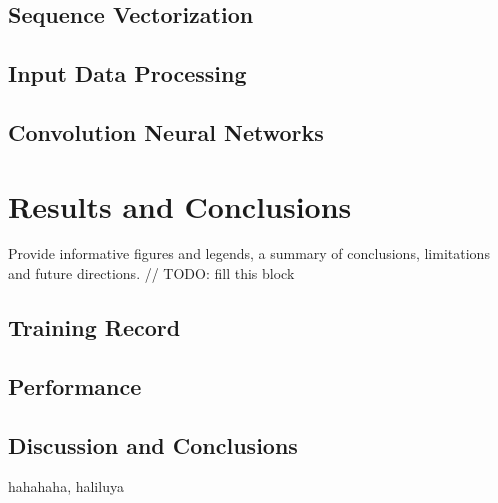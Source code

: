 \documentclass[letterpaper, 11pt]{article}
\begin{document}
\begin{multicols*}{2}
{\subsection{Sequence Vectorization}

\subsection{Input Data Processing}

\subsection{Convolution Neural Networks}

}

\section{Results and Conclusions}

{
Provide informative figures and legends, a summary of conclusions, limitations and future directions.
\newline 
// TODO: fill this block
\subsection{Training Record}

\subsection{Performance}

\subsection{Discussion and Conclusions}
}
\end{multicols*}

\newpage
\begin{multicols*}{2}

\begin{thebibliography}{1}
hahahaha, haliluya
\end{thebibliography}

\end{multicols*}
\end{document}
